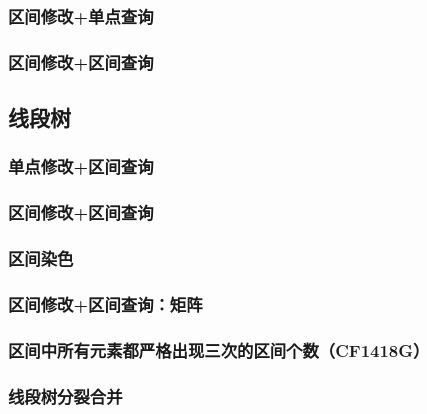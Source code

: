 \documentclass[landscape,twocolumn,twoside,a4paper]{article}
\begin{document}
\subsubsection{区间修改+单点查询}


\subsubsection{区间修改+区间查询}



\subsection{线段树}


\subsubsection{单点修改+区间查询}


\subsubsection{区间修改+区间查询}


\subsubsection{区间染色}


\subsubsection{区间修改+区间查询：矩阵}


\subsubsection{区间中所有元素都严格出现三次的区间个数（CF1418G）}


\subsubsection{线段树分裂合并}

\end{document}
